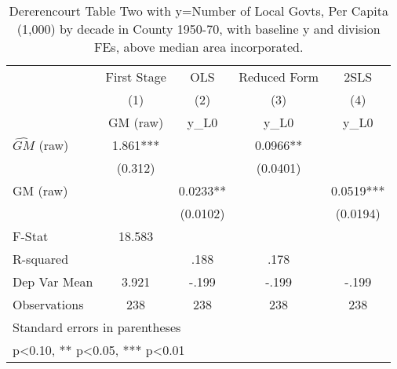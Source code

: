 \begin{table}[htbp]\centering
\def\sym#1{\ifmmode^{#1}\else\(^{#1}\)\fi}
\caption{Dererencourt Table Two with y=Number of Local Govts, Per Capita (1,000) by decade in County 1950-70, with baseline y and division FEs, above median area incorporated.}
\begin{tabular}{l*{4}{c}}
\toprule
                    & First Stage   &         OLS   &Reduced Form   &        2SLS   \\
                    &\multicolumn{1}{c}{(1)}&\multicolumn{1}{c}{(2)}&\multicolumn{1}{c}{(3)}&\multicolumn{1}{c}{(4)}\\
                    &\multicolumn{1}{c}{GM  (raw)}&\multicolumn{1}{c}{y\_L0}&\multicolumn{1}{c}{y\_L0}&\multicolumn{1}{c}{y\_L0}\\
\midrule
$\hat{GM}$ (raw)    &       1.861***&               &      0.0966** &               \\
                    &     (0.312)   &               &    (0.0401)   &               \\
\addlinespace
GM  (raw)           &               &      0.0233** &               &      0.0519***\\
                    &               &    (0.0102)   &               &    (0.0194)   \\
\midrule
F-Stat              &      18.583   &               &               &               \\
R-squared           &               &        .188   &        .178   &               \\
Dep Var Mean        &       3.921   &       -.199   &       -.199   &       -.199   \\
Observations        &         238   &         238   &         238   &         238   \\
\bottomrule
\multicolumn{5}{l}{\footnotesize Standard errors in parentheses}\\
\multicolumn{5}{l}{\footnotesize * p<0.10, ** p<0.05, *** p<0.01}\\
\end{tabular}
\end{table}
